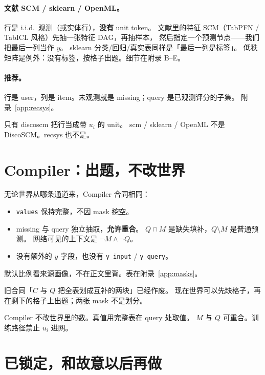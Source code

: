\documentclass[11pt,a4paper,fontset=none]{ctexart}
\begin{document}
\paragraph{文献 SCM / sklearn / OpenML。}
行是 i.i.d.\ 观测（或实体行），\textbf{没有} unit token。
文献里的特征 SCM（TabPFN / TabICL 风格）先抽一张特征 DAG，再抽样本，
然后指定一个预测节点——我们把最后一列当作 $y$。
sklearn 分类/回归/真实表同样是「最后一列是标签」。
低秩矩阵是例外：没有标签，按格子出题。细节在附录 B--E。

\paragraph{推荐。}
行是 user，列是 item。未观测就是 missing；query 是已观测评分的子集。
附录~\ref{app:recsys}。

\begin{lockbox}
只有 discoscm 把行当成带 $u_i$ 的 unit。
scm / sklearn / OpenML 不是 DiscoSCM。recsys 也不是。
\end{lockbox}

\section{Compiler：出题，不改世界}

无论世界从哪条通道来，Compiler 合同相同：

\begin{itemize}
  \item \texttt{values} 保持完整，不因 mask 挖空。
  \item missing 与 query 独立抽取，\textbf{允许重合}。
        $Q\cap M$ 是缺失填补，$Q\setminus M$ 是普通预测。
        网络可见的上下文是 $\neg M\wedge\neg Q$。
  \item 没有额外的 $y$ 字段，也没有 \texttt{y\_input} / \texttt{y\_query}。
\end{itemize}

默认比例看来源画像，不在正文里背。表在附录~\ref{app:masks}。

旧合同「$C$ 与 $Q$ 把全表划成互补的两块」已经作废。
现在世界可以先缺格子，再在剩下的格子上出题；两张 mask 不是划分。

\begin{lockbox}
Compiler 不改世界里的数。真值用完整表在 query 处取值。
$M$ 与 $Q$ 可重合。训练路径禁止 $u_i$ 进网。
\end{lockbox}

\section{已锁定，和故意以后再做}
\end{document}
